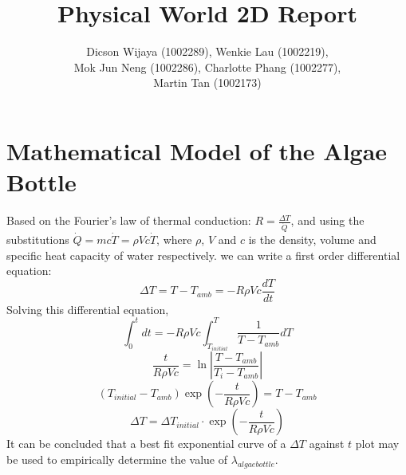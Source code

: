 \documentclass[10pt,a4paper]{IEEEtran}
\author{Dicson Wijaya (1002289), Wenkie Lau (1002219), \\ Mok Jun Neng (1002286), Charlotte Phang (1002277),\\ Martin Tan (1002173)}
\title{Physical World 2D Report}
\begin{document}
	\maketitle
	\section{Mathematical Model of the Algae Bottle}
	Based on the Fourier's law of thermal conduction: $R = \frac{\Delta T}{\dot{Q}}$, and using the substitutions $\dot{Q} = mc \dot{T} = \rho V c \dot{T}$, where $\rho$, $V$ and $c$ is the density, volume and specific heat capacity of water respectively. we can write a first order differential equation:
	$$\Delta T = T - T_{amb} = -R \rho V c \frac{dT}{dt}$$
	Solving this differential equation,
	$$\int_{0}^{t} dt = -R \rho V c \int_{T_{initial}}^{T}\frac{1}{T-T_{amb}} dT$$
	$$\frac{t}{R \rho V c} = \ln \left| \frac{T - T_{amb}}{T_i - T_{amb}} \right|$$
	$$\left( T_{initial} - T_{amb} \right) \exp(-\frac{t}{R \rho V c}) = T - T_{amb}$$
	$$\Delta T = \Delta T_{initial} \cdot \exp(-\frac{t}{R \rho V c})$$
	It can be concluded that a best fit exponential curve of a $\Delta T$ against $t$ plot may be used to empirically determine the value of $\lambda_{algae bottle}$.
\end{document}
